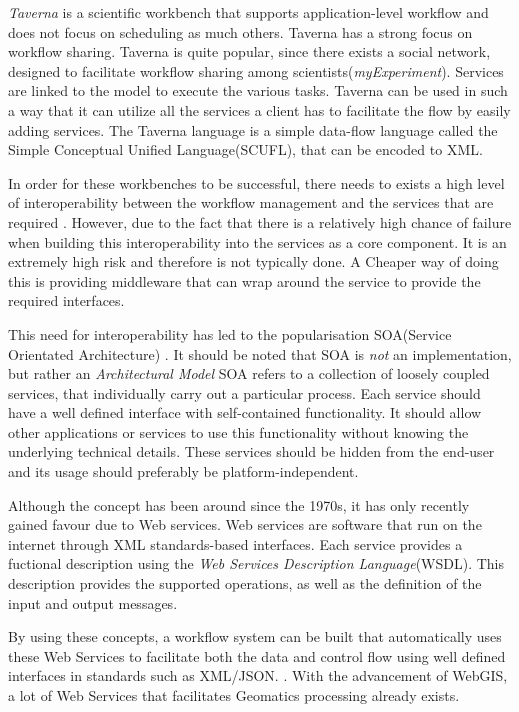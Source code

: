 \documentclass[12pt,a4paper]{report}
\begin{document}
    \emph{Taverna} is a scientific workbench that supports application-level
workflow and does not focus on scheduling as much others\cite{4721191}. Taverna
has a strong focus on workflow sharing. Taverna is quite popular, since there
exists a social network, designed to facilitate workflow sharing among
scientists(\emph{myExperiment}). Services are linked to the model to execute
the various tasks. Taverna can be used in such a way that it can utilize all
the services a client has to facilitate the flow by easily adding services. The
Taverna language is a simple data-flow language called the Simple Conceptual
Unified Language(SCUFL), that can be encoded to XML.

In order for these workbenches to be successful, there needs to exists a
high level of interoperability between the workflow management and the services
that are required \cite{Shegalov:2001:XWM:767132.767139}.  However, due to the
fact that there is a relatively high chance of failure when building this
interoperability into the services as a core component. It is an extremely high
risk and therefore is not typically done. A Cheaper way of doing this is
providing middleware that can wrap around the service to provide the required
interfaces.

This need for interoperability has led to the popularisation SOA(Service
Orientated Architecture) \cite{Sanders:2008:SSA:1400549.1400595}.  It should be
noted that SOA is \emph{not} an implementation, but rather an
\emph{Architectural Model} SOA refers to a collection of loosely coupled
services, that individually carry out a particular process. Each service should
have a well defined interface with self-contained functionality. It should
allow other applications or services to use this functionality without knowing
the underlying technical details. These services should be hidden from the
end-user and its usage should preferably be platform-independent.

Although the concept has been around since the 1970s, it has only recently
gained favour due to Web services.  Web services are software that run on the
internet through XML standards-based
interfaces\cite{Tai:2004:CCW:1045658.1045680}.  Each service provides a
fuctional description using the \emph{Web Services Description Language}(WSDL).
This description provides the supported operations, as well as the definition
of the input and output messages.

By using these concepts, a workflow system can be built that automatically uses
these Web Services to facilitate both the data and control flow using well
defined interfaces in standards such as XML/JSON.
\cite{Shegalov:2001:XWM:767132.767139}. With the advancement of WebGIS, a lot
of Web Services that facilitates Geomatics processing already exists.
\end{document}
